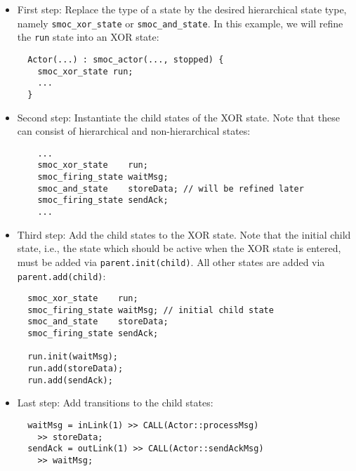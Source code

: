 \begin{frame}[fragile=singleslide]
\begin{itemize}
\item First step: Replace the type of a state by the desired hierarchical state type, namely \texttt{smoc\_xor\_state} or \texttt{smoc\_and\_state}.  In this example, we will refine the \texttt{run} state into an XOR state:
\begin{lstlisting}
  Actor(...) : smoc_actor(..., stopped) {
    smoc_xor_state run;
    ...
  }
\end{lstlisting}
\item Second step: Instantiate the child states of the XOR state. Note that these can consist of hierarchical and non-hierarchical states:
\begin{lstlisting}
    ...    
    smoc_xor_state    run;
    smoc_firing_state waitMsg;
    smoc_and_state    storeData; // will be refined later
    smoc_firing_state sendAck;
    ...
\end{lstlisting}
\end{itemize}
\end{frame}

\begin{frame}[fragile=singleslide]
\begin{itemize}
\item Third step: Add the child states to the XOR state. Note that the initial child state, i.e., the state which should be active when the XOR state is entered, must be added via \texttt{parent.init(child)}. All other states are added via \texttt{parent.add(child)}:
\begin{lstlisting}
  smoc_xor_state    run;
  smoc_firing_state waitMsg; // initial child state
  smoc_and_state    storeData;
  smoc_firing_state sendAck;

  run.init(waitMsg);
  run.add(storeData);
  run.add(sendAck);
\end{lstlisting}
\item Last step: Add transitions to the child states:
\begin{lstlisting}
  waitMsg = inLink(1) >> CALL(Actor::processMsg)
    >> storeData;
  sendAck = outLink(1) >> CALL(Actor::sendAckMsg)
    >> waitMsg;
\end{lstlisting}
\end{itemize}
\end{frame}


